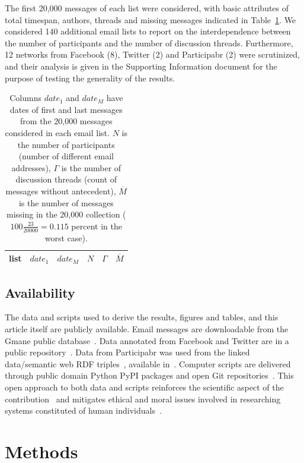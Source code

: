 The first 20,000 messages of each list were considered, with basic attributes of total timespan, authors, threads and missing messages indicated in Table~\ref{tab:genLists}. We considered 140 additional email lists to report on the interdependence between the number of participants and the number of discussion threads. Furthermore, 12 networks from Facebook (8), Twitter (2) and Participabr (2) were scrutinized, and their analysis is given in the Supporting Information document for the purpose of testing the generality of the results.

 
\begin{table}
\centering
\caption{Columns $date_1$ and $date_M$ have dates of first and last messages from the 20,000 messages considered in each email list.
$N$ is the number of participants (number of different email addresses),
$\Gamma$ is the number of discussion threads (count of messages without antecedent),
$\overline{M}$ is the number of messages missing in the 20,000 collection
($100\frac{23}{20000}=0.115$ percent in the worst case).
}
\label{tab:genLists}
\begin{tabular}{|l|c|c|c|c|c|}\hline
list & $date_1$ & $date_{M}$    & $N$  & $\Gamma$ & $\overline{M}$ \\\hline

\end{tabular}
\end{table} 

\subsection{Availability}
The data and scripts used to derive the results, figures and tables, and this article itself are publicly available. Email messages are downloadable from the Gmane public database~\cite{Gmanewikipedia}.
Data annotated from Facebook and Twitter are in a public repository~\cite{fbtwData}.
Data from Participabr was used from the linked data/semantic web RDF triples~\cite{opa}, available in~\cite{datahub}.
Computer scripts are delivered through public domain Python PyPI packages and open Git repositories~\cite{gmanePack}.
This open approach to both data and scripts reinforces the scientific aspect of the contribution~\cite{openSci} and mitigates ethical and moral issues involved in researching systems constituted of human individuals~\cite{anPhy,ccs15}.
 


\section{Methods}\label{sec:carac}

